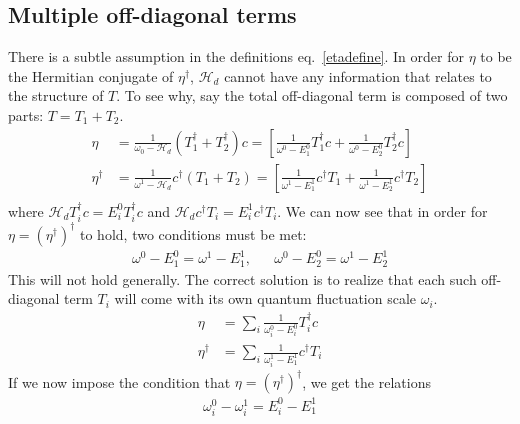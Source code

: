 \subsection*{Multiple off-diagonal terms}
There is a subtle assumption in the definitions eq.~\ref{etadefine}. In order for \(\eta\) to be the Hermitian conjugate of \(\eta^\dagger\), \(\mathcal{H}_d\) cannot have any information that relates to the structure of \(T\). To see why, say the total off-diagonal term is composed of two parts: \(T = T_1 + T_2\).
\begin{equation}\begin{aligned}
	\eta &= \frac{1}{\omega_0 - \mathcal{H}_d}\left(T_1^\dagger + T_2^\dagger\right)c = \left[\frac{1}{\omega^0 - E^0_1} T_1^\dagger c+ \frac{1}{\omega^0 - E^0_2}T_2^\dagger c\right]\\
	\eta^\dagger &= \frac{1}{\omega^1 - \mathcal{H}_d}c^\dagger\left(T_1 + T_2\right) = \left[\frac{1}{\omega^1 - E^1_1}c^\dagger T_1 + \frac{1}{\omega^1 - E^1_2} c^\dagger T_2\right]\\
\end{aligned}\end{equation}
where \(\mathcal{H}_d T_i^\dagger c = E^0_i T_i^\dagger c\) and \(\mathcal{H}_d  c^\dagger T_i = E^1_i  c^\dagger T_i\). We can now see that in order for \(\eta = \left(\eta^\dagger\right)^\dagger\) to hold, two conditions must be met:
\begin{equation}\begin{aligned}
	\omega^0 - E_1^0 = \omega^1 - E_1^1, && \omega^0 - E_2^0 = \omega^1 - E_2^1
\end{aligned}\end{equation}
This will not hold generally. The correct solution is to realize that each such off-diagonal term \(T_i\) will come with its own quantum fluctuation scale \(\omega_i\).
\begin{equation}\begin{aligned}
	\eta &= \sum_i \frac{1}{\omega^0_i - E^0_i} T_i^\dagger c\\
	\eta^\dagger &= \sum_i \frac{1}{\omega^1_i - E^1_1}c^\dagger T_i
\end{aligned}\end{equation}
If we now impose the condition that \(\eta =  \left( \eta^\dagger \right) ^\dagger\), we get the relations
\begin{equation}\begin{aligned}
	\omega^0_i - \omega^1_i = E^0_i - E^1_1
\end{aligned}\end{equation}
